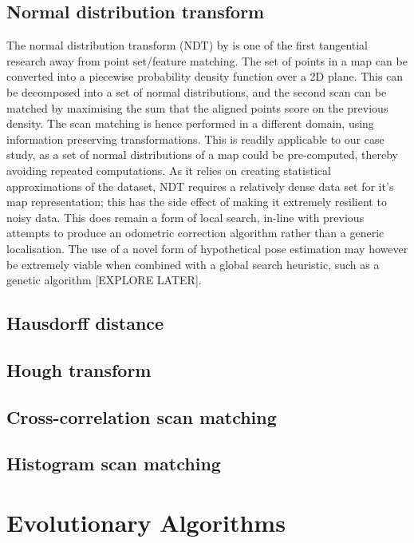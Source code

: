 \documentclass[authoryearcitations]{UoYCSproject}
\begin{document}
\subsection{Normal distribution transform}
The normal distribution transform (NDT) by \citet{Biber2003-kb} is one of the first tangential research away from point set/feature matching. The set of points in a map can be converted into a piecewise probability density function over a 2D plane. This can be decomposed into a set of normal distributions, and the second scan can be matched by maximising the sum that the aligned points score on the previous density. The scan matching is hence performed in a different domain, using information preserving transformations. This is readily applicable to our case study, as a set of normal distributions of a map could be pre-computed, thereby avoiding repeated computations. As it relies on creating statistical approximations of the dataset, NDT requires a relatively dense data set for it's map representation; this has the side effect of making it extremely resilient to noisy data. This does remain a form of local search, in-line with previous attempts to produce an odometric correction algorithm rather than a generic localisation. The use of a novel form of hypothetical pose estimation may however be extremely viable when combined with a global search heuristic, such as a genetic algorithm [EXPLORE LATER].


\subsection{Hausdorff distance}

\subsection{Hough transform}
\subsection{Cross-correlation scan matching}
\subsection{Histogram scan matching}

\section{Evolutionary Algorithms}
\end{document}

